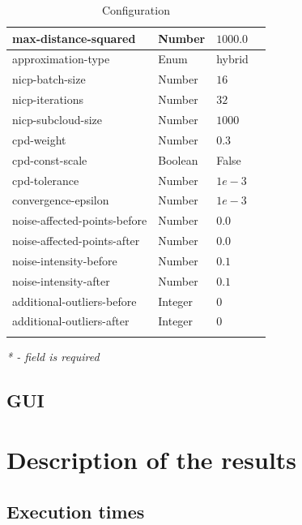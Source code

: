 \documentclass[titlepage]{article}
\begin{document}
\begin{center}
\begin{longtable}{ | m{13em} | m{5em} | m{3em}| m{19em}| }
 \hline
 max-distance-squared & Number & $1000.0$ & \\ 
 \hline
 approximation-type & Enum & hybrid & \\ 
 \hline
 nicp-batch-size & Number & $16$ & \\ 
 \hline
 nicp-iterations & Number & $32$ & \\ 
 \hline
 nicp-subcloud-size & Number & $1000$ & \\ 
 \hline 
 cpd-weight & Number & $0.3$ & \\ 
 \hline
 cpd-const-scale & Boolean & False & \\ 
 \hline
 cpd-tolerance & Number & $1e-3$ & \\ 
 \hline
 convergence-epsilon & Number & $1e-3$ & \\ 
 \hline
 noise-affected-points-before & Number & $0.0$ & \\ 
 \hline
 noise-affected-points-after & Number & $0.0$ & \\ 
 \hline
 noise-intensity-before & Number & $0.1$ & \\ 
 \hline
 noise-intensity-after & Number & $0.1$ & \\ 
 \hline
 additional-outliers-before & Integer & $0$ & \\ 
 \hline
 additional-outliers-after & Integer & $0$ & \\ 
 \hline
 \caption{Configuration}
\end{longtable}
\label{tab:configuration}
\end{center}
\textit{* - field is required}




\subsection{GUI}

\section{Description of the results}

\subsection{Execution times}
\end{document}

